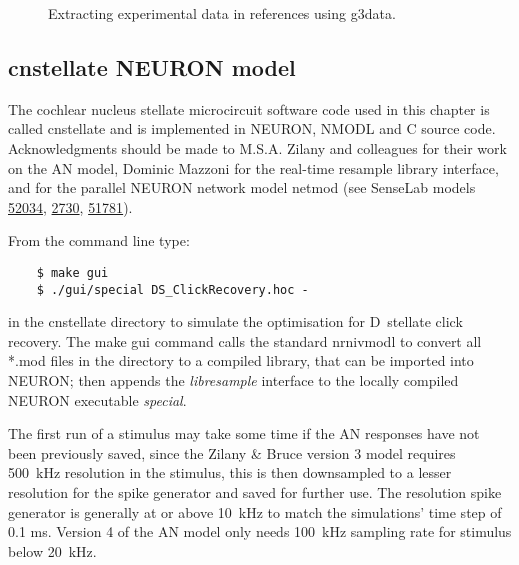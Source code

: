 


\begin{figure}[htb]
  \begin{center}
    \caption{Extracting experimental data in references using g3data.}
    \label{fig:Extractdata}
  \end{center}
\end{figure}


\subsection{\textsf{cnstellate} NEURON model    \label{sec:cnstellate-neur-model}}

The cochlear nucleus stellate microcircuit software code used in this chapter is
called \textsf{cnstellate} and is implemented in NEURON, NMODL and C source
code. Acknowledgments should be made to M.S.A. Zilany and colleagues for their
work on the AN model, Dominic Mazzoni for the real-time resample library
interface, and \citet{MiglioreCanniaEtAl:2006} for the parallel NEURON network model \textsf{netmod} (see SenseLab models
\href{http://senselab.med.yale.edu/senselab/modeldb/ShowModel.asp?model=52034}{52034},
\href{http://senselab.med.yale.edu/senselab/modeldb/ShowModel.asp?model=2730}{2730},
\href{http://senselab.med.yale.edu/senselab/modeldb/ShowModel.asp?model=51781}{51781}).



From the command line type:
\begin{verbatim}
    $ make gui
    $ ./gui/special DS_ClickRecovery.hoc -
\end{verbatim}
in the \textsf{cnstellate} directory to simulate the optimisation for D~stellate
click recovery.  The \textsf{make gui} command calls the standard
\textsf{nrnivmodl} to convert all *.mod files in the directory to a compiled
library, that can be imported into NEURON; then appends the \textit{libresample}
interface to the locally compiled NEURON executable \textit{special}.

The first run of a stimulus may take some time if the AN responses have not been previously saved, since the Zilany \& Bruce version 3 model requires 500~kHz resolution in the stimulus, this is then downsampled to a lesser resolution for the spike generator and saved for further use.
The resolution spike generator is generally at or above 10~kHz to match the simulations' time step of 0.1 ms.
Version 4 of the AN model \citep{ZilanyBruceEtAl:2009} only needs 100~kHz sampling rate for stimulus below 20~kHz.


